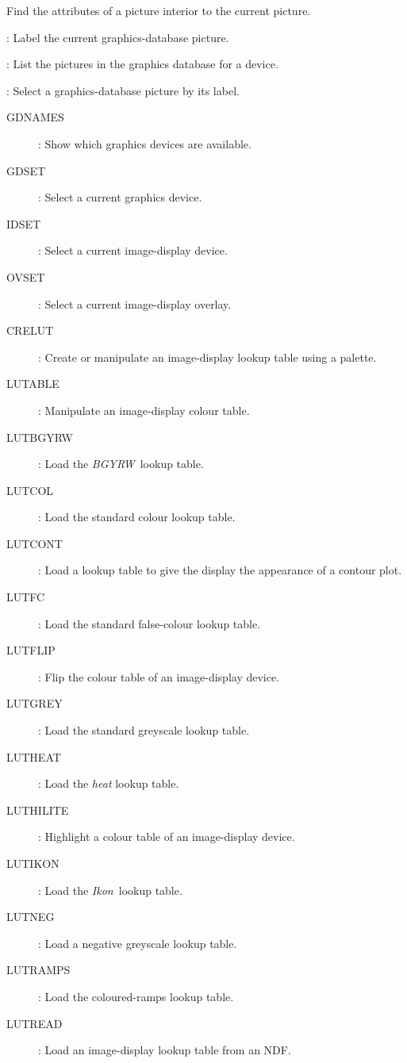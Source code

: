 \begin{description}
\begin{description}
\begin{description}
 Find the attributes of a picture interior to the current picture.
\item [PICLABEL]:
 Label the current graphics-database picture.
\item [PICLIST]:
 List the pictures in the graphics database for a device.
\item [PICSEL]:
 Select a graphics-database picture by its label.
\end{description}
\item [Device selection:]\hfill
\begin{description}
\item [GDNAMES]:
 Show which graphics devices are available.
\item [GDSET]:
 Select a current graphics device.
\item [IDSET]:
 Select a current image-display device.
\item [OVSET]:
 Select a current image-display overlay.
\end{description}
\item [Lookup/Colour tables:]\hfill
\begin{description}
\item [CRELUT]:
 Create or manipulate an image-display lookup table using a palette.
\item [LUTABLE]:
 Manipulate an image-display colour table.
\item [LUTBGYRW]:
 Load the {\it BGYRW}\ lookup table.
\item [LUTCOL]:
 Load the standard colour lookup table.
\item [LUTCONT]:
 Load a lookup table to give the display the appearance of a contour plot.
\item [LUTFC]:
 Load the standard false-colour lookup table.
\item [LUTFLIP]:
 Flip the colour table of an image-display device.
\item [LUTGREY]:
 Load the standard greyscale lookup table.
\item [LUTHEAT]:
 Load the {\it heat} lookup table.
\item [LUTHILITE]:
 Highlight a colour table of an image-display device.
\item [LUTIKON]:
 Load the {\it Ikon}\ lookup table.
\item [LUTNEG]:
 Load a negative greyscale lookup table.
\item [LUTRAMPS]:
 Load the coloured-ramps lookup table.
\item [LUTREAD]:
 Load an image-display lookup table from an NDF.

\end{description}
\end{description}
\end{description}
